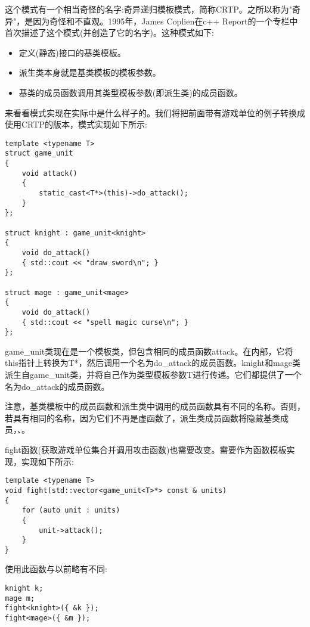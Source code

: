 
这个模式有一个相当奇怪的名字:奇异递归模板模式，简称CRTP。之所以称为"奇异"，是因为奇怪和不直观。1995年，James Coplien在c++ Report的一个专栏中首次描述了这个模式(并创造了它的名字)。这种模式如下:

\begin{itemize}
\item
定义(静态)接口的基类模板。

\item
派生类本身就是基类模板的模板参数。

\item
基类的成员函数调用其类型模板参数(即派生类)的成员函数。
\end{itemize}

来看看模式实现在实际中是什么样子的。我们将把前面带有游戏单位的例子转换成使用CRTP的版本，模式实现如下所示:

\begin{lstlisting}[style=styleCXX]
template <typename T>
struct game_unit
{
	void attack()
	{
		static_cast<T*>(this)->do_attack();
	}
};

struct knight : game_unit<knight>
{
	void do_attack()
	{ std::cout << "draw sword\n"; }
};

struct mage : game_unit<mage>
{
	void do_attack()
	{ std::cout << "spell magic curse\n"; }
};
\end{lstlisting}

game\_unit类现在是一个模板类，但包含相同的成员函数attack。在内部，它将this指针上转换为T*，然后调用一个名为do\_attack的成员函数。knight和mage类派生自game\_unit类，并将自己作为类型模板参数T进行传递。它们都提供了一个名为do\_attack的成员函数。

注意，基类模板中的成员函数和派生类中调用的成员函数具有不同的名称。否则，若具有相同的名称，因为它们不再是虚函数了，派生类成员函数将隐藏基类成员，、。

fight函数(获取游戏单位集合并调用攻击函数)也需要改变。需要作为函数模板实现，实现如下所示:

\begin{lstlisting}[style=styleCXX]
template <typename T>
void fight(std::vector<game_unit<T>*> const & units)
{
	for (auto unit : units)
	{
		unit->attack();
	}
}
\end{lstlisting}

使用此函数与以前略有不同:

\begin{lstlisting}[style=styleCXX]
knight k;
mage m;
fight<knight>({ &k });
fight<mage>({ &m });
\end{lstlisting}

